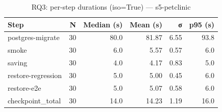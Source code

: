 \begin{table}[htbp]
\centering
\small
\caption{RQ3: per-step durations (iso=True) — s5-petclinic}
\label{tab:rq3-s5-petclinic-steps}
\begin{tabular}{lrrrrr}
\toprule
\textbf{Step} & \textbf{N} & \textbf{Median (s)} & \textbf{Mean (s)} & \textbf{σ} & \textbf{p95 (s)} \\
\midrule
postgres-migrate & 30 & 80.0 & 81.87 & 6.55 & 93.8 \\
smoke & 30 & 6.0 & 5.57 & 0.57 & 6.0 \\
saving & 30 & 4.0 & 4.17 & 0.83 & 5.0 \\
restore-regression & 30 & 5.0 & 5.00 & 0.45 & 6.0 \\
restore-e2e & 30 & 5.0 & 5.07 & 0.58 & 6.0 \\
checkpoint_total & 30 & 14.0 & 14.23 & 1.19 & 16.0 \\
\bottomrule
\end{tabular}
\end{table}